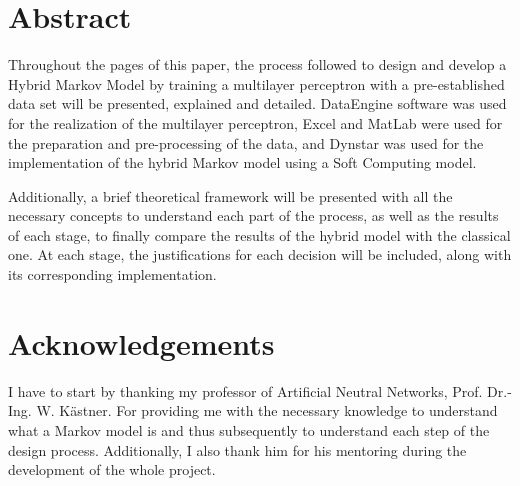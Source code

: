 \documentclass{article}
\begin{document}
\section*{Abstract}

\par Throughout the pages of this paper, the process followed to design and develop a Hybrid Markov Model by training a multilayer perceptron with a pre-established data set will be presented, explained and detailed. DataEngine software was used for the realization of the multilayer perceptron, Excel and MatLab were used for the preparation and pre-processing of the data, and Dynstar was used for the implementation of the hybrid Markov model using a Soft Computing model.

\par Additionally, a brief theoretical framework will be presented with all the necessary concepts to understand each part of the process, as well as the results of each stage, to finally compare the results of the hybrid model with the classical one. At each stage, the justifications for each decision will be included, along with its corresponding implementation. 






\newpage
\section*{Acknowledgements} 

\par I have to start by thanking my professor of Artificial Neutral Networks, Prof. Dr.-Ing. W. Kästner. For providing me with the necessary knowledge to understand what a Markov model is and thus subsequently to understand each step of the design process. Additionally, I also thank him for his mentoring during the development of the whole project.






\newpage 
\tableofcontents
\listoftables
\listoffigures





\end{document}

